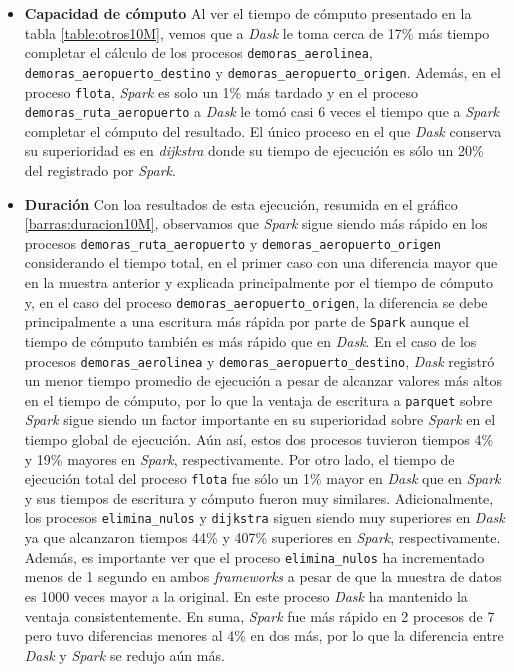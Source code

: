 \begin{itemize}
	\item \textbf{Capacidad de cómputo} Al ver el tiempo de cómputo presentado en la tabla \ref{table:otros10M}, vemos que a \textit{Dask} le toma cerca de 17\% más tiempo completar el cálculo de los procesos \texttt{demoras\_aerolinea}, \texttt{demoras\_aeropuerto\_destino} y \texttt{demoras\_aeropuerto\_origen}. Además, en el proceso \texttt{flota}, \textit{Spark} es solo un 1\% más tardado y en el proceso \texttt{demoras\_ruta\_aeropuerto} a \textit{Dask} le tomó casi 6 veces el tiempo que a \textit{Spark} completar el cómputo del resultado. El único proceso en el que \textit{Dask} conserva su superioridad es en \textit{dijkstra} donde su tiempo de ejecución es sólo un 20\% del registrado por \textit{Spark}. 
	
	\item \textbf{Duración} Con loa resultados de esta ejecución, resumida en el gráfico \ref{barras:duracion10M}, observamos que \textit{Spark} sigue siendo más rápido en los procesos \texttt{demoras\_ruta\_aeropuerto} y \texttt{demoras\_aeropuerto\_origen} considerando el tiempo total, en el primer caso con una diferencia mayor que en la muestra anterior y explicada principalmente por el tiempo de cómputo y, en el caso del proceso \texttt{demoras\_aeropuerto\_origen}, la diferencia se debe principalmente a una escritura más rápida por parte de \texttt{Spark} aunque el tiempo de cómputo también es más rápido que en \textit{Dask}. En el caso de los procesos \texttt{demoras\_aerolinea} y \texttt{demoras\_aeropuerto\_destino}, \textit{Dask} registró un menor tiempo promedio de ejecución a pesar de alcanzar valores más altos en el tiempo de cómputo, por lo que la ventaja de escritura a \texttt{parquet} sobre \textit{Spark} sigue siendo un factor importante en su superioridad sobre \textit{Spark} en el tiempo global de ejecución. Aún así, estos dos procesos tuvieron tiempos 4\% y 19\% mayores en \textit{Spark}, respectivamente. Por otro lado, el tiempo de ejecución total del proceso \texttt{flota} fue sólo un 1\% mayor en \textit{Dask} que en \textit{Spark} y sus tiempos de escritura y cómputo fueron muy similares. Adicionalmente, los procesos \texttt{elimina\_nulos} y \texttt{dijkstra} siguen siendo muy superiores en \textit{Dask} ya que alcanzaron tiempos 44\% y 407\% superiores en \textit{Spark}, respectivamente. Además, es importante ver que el proceso \texttt{elimina\_nulos} ha incrementado menos de 1 segundo en ambos \textit{frameworks} a pesar de que la muestra de datos es 1000 veces mayor a la original. En este proceso \textit{Dask} ha mantenido la ventaja consistentemente. En suma, \textit{Spark} fue más rápido en 2 procesos de 7 pero tuvo diferencias menores al 4\% en dos más, por lo que la diferencia entre \textit{Dask} y \textit{Spark} se redujo aún más.

\end{itemize}


